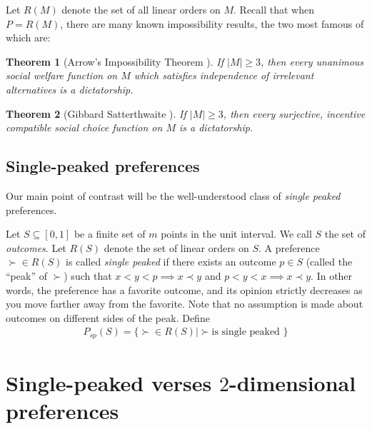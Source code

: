 \documentclass[12pt]{article}
\newtheorem{theorem}{Theorem}
\newcommand{\1}[1]{\mathds{1}[{#1}]}
\begin{document}
    Let $R(M)$ denote the set of all linear orders on $M$.
    Recall that when $P = R(M)$, there are many known impossibility results,
    the two most famous of which are:

    \begin{theorem}[Arrow's Impossibility Theorem \cite{AgtBookMechDesignInto}]
      If $|M| \ge 3$, then
      every unanimous social welfare function on $M$ which satisfies independence of
      irrelevant alternatives is a dictatorship.
    \end{theorem}

    \begin{theorem}[Gibbard Satterthwaite \cite{AgtBookNoMoney}]
      If $|M| \ge 3$, then
      every surjective, incentive compatible social choice function on $M$
      is a dictatorship.
    \end{theorem}

  \subsection{Single-peaked preferences}
    Our main point of contrast will be the well-understood class of
    \emph{single peaked} preferences.

    Let $S\subseteq [0,1]$ be a finite set of $m$ points in the unit interval.
    We call $S$ the set of \emph{outcomes}.
    Let $R(S)$ denote the set of linear orders on $S$.
    A preference $\succ \in R(S)$ is called \emph{single peaked} if
    there exists an outcome $p\in S$ (called the ``peak'' of $\succ$)
    such that $x < y < p \implies x \prec y$ and $p < y < x \implies x \prec y$.
    In other words, the preference has a favorite outcome,
    and its opinion strictly decreases as you move farther away from the favorite.
    Note that no assumption is made about outcomes on different sides of the peak.
    Define
    \begin{align*}
      P_{sp}(S) = \{ \succ \in R(S) | \succ \text{is single peaked }\}
    \end{align*}


\section{Single-peaked verses $2$-dimensional preferences}
  \label{sec:singleVsTwoD}

\end{document}
